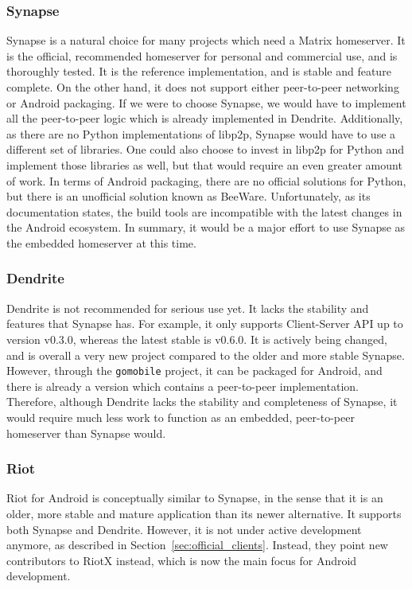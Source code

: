 \subsubsection{Synapse}
Synapse is a natural choice for many projects which need a Matrix homeserver.
It is the official, recommended homeserver for personal and commercial use, and is thoroughly tested.
It is the reference implementation, and is stable and feature complete.
On the other hand, it does not support either peer-to-peer networking or Android packaging.
If we were to choose Synapse, we would have to implement all the peer-to-peer logic which is already implemented in Dendrite.
Additionally, as there are no Python implementations of libp2p, Synapse would have to use a different set of libraries.
One could also choose to invest in libp2p for Python and implement those libraries as well, but that would require an even greater amount of work.
In terms of Android packaging, there are no official solutions for Python, but there is an unofficial solution known as BeeWare\footnotemark.
Unfortunately, as its documentation states\footnotemark, the build tools are incompatible with the latest changes in the Android ecosystem.
In summary, it would be a major effort to use Synapse as the embedded homeserver at this time.

\subsubsection{Dendrite}
Dendrite is not recommended for serious use yet.
It lacks the stability and features that Synapse has.
For example, it only supports Client-Server API up to version v0.3.0, whereas the latest stable is v0.6.0.
It is actively being changed, and is overall a very new project compared to the older and more stable Synapse.
However, through the \texttt{gomobile} project, it can be packaged for Android, and there is already a version which contains a peer-to-peer implementation.
Therefore, although Dendrite lacks the stability and completeness of Synapse, it would require much less work to function as an embedded, peer-to-peer homeserver than Synapse would.

\subsubsection{Riot}
Riot for Android is conceptually similar to Synapse, in the sense that it is an older, more stable and mature application than its newer alternative.
It supports both Synapse and Dendrite.
However, it is not under active development anymore, as described in Section~\ref{sec:official_clients}.
Instead, they point new contributors to RiotX instead, which is now the main focus for Android development.

